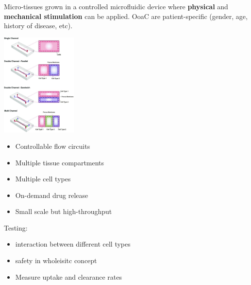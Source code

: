 Micro-tissues grown in a controlled
microfluidic device where \textbf{physical} and
\textbf{mechanical stimulation} can be applied. OoaC are patient-specific (gender, age, history
of disease, etc).\\

\begin{minipage}
{0.48\linewidth}
    \includegraphics[width=38mm]{src/Images/organ_chip.png}
\end{minipage}
\begin{minipage}{0.50\linewidth}
    \begin{itemize}
        \item Controllable flow circuits
        \item Multiple tissue compartments
        \item Multiple cell types
        \item On-demand drug release
        \item Small scale but high-throughput
    \end{itemize}
Testing:
    \begin{itemize}
        \item interaction between different cell types
        \item safety in wholeisitc concept
        \item Measure uptake and clearance rates
    \end{itemize}
\end{minipage}
